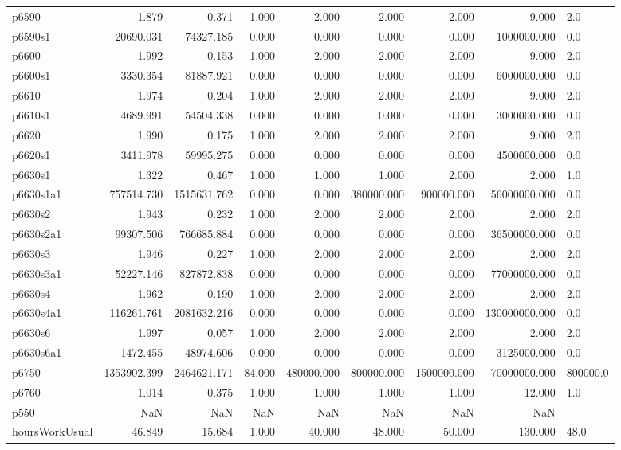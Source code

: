 \begin{longtable}{lrrrrrrrl}
p6590 & 1.879 & 0.371 & 1.000 & 2.000 & 2.000 & 2.000 & 9.000 & 2.0 \\
p6590s1 & 20690.031 & 74327.185 & 0.000 & 0.000 & 0.000 & 0.000 & 1000000.000 & 0.0 \\
p6600 & 1.992 & 0.153 & 1.000 & 2.000 & 2.000 & 2.000 & 9.000 & 2.0 \\
p6600s1 & 3330.354 & 81887.921 & 0.000 & 0.000 & 0.000 & 0.000 & 6000000.000 & 0.0 \\
p6610 & 1.974 & 0.204 & 1.000 & 2.000 & 2.000 & 2.000 & 9.000 & 2.0 \\
p6610s1 & 4689.991 & 54504.338 & 0.000 & 0.000 & 0.000 & 0.000 & 3000000.000 & 0.0 \\
p6620 & 1.990 & 0.175 & 1.000 & 2.000 & 2.000 & 2.000 & 9.000 & 2.0 \\
p6620s1 & 3411.978 & 59995.275 & 0.000 & 0.000 & 0.000 & 0.000 & 4500000.000 & 0.0 \\
p6630s1 & 1.322 & 0.467 & 1.000 & 1.000 & 1.000 & 2.000 & 2.000 & 1.0 \\
p6630s1a1 & 757514.730 & 1515631.762 & 0.000 & 0.000 & 380000.000 & 900000.000 & 56000000.000 & 0.0 \\
p6630s2 & 1.943 & 0.232 & 1.000 & 2.000 & 2.000 & 2.000 & 2.000 & 2.0 \\
p6630s2a1 & 99307.506 & 766685.884 & 0.000 & 0.000 & 0.000 & 0.000 & 36500000.000 & 0.0 \\
p6630s3 & 1.946 & 0.227 & 1.000 & 2.000 & 2.000 & 2.000 & 2.000 & 2.0 \\
p6630s3a1 & 52227.146 & 827872.838 & 0.000 & 0.000 & 0.000 & 0.000 & 77000000.000 & 0.0 \\
p6630s4 & 1.962 & 0.190 & 1.000 & 2.000 & 2.000 & 2.000 & 2.000 & 2.0 \\
p6630s4a1 & 116261.761 & 2081632.216 & 0.000 & 0.000 & 0.000 & 0.000 & 130000000.000 & 0.0 \\
p6630s6 & 1.997 & 0.057 & 1.000 & 2.000 & 2.000 & 2.000 & 2.000 & 2.0 \\
p6630s6a1 & 1472.455 & 48974.606 & 0.000 & 0.000 & 0.000 & 0.000 & 3125000.000 & 0.0 \\
p6750 & 1353902.399 & 2464621.171 & 84.000 & 480000.000 & 800000.000 & 1500000.000 & 70000000.000 & 800000.0 \\
p6760 & 1.014 & 0.375 & 1.000 & 1.000 & 1.000 & 1.000 & 12.000 & 1.0 \\
p550 & NaN & NaN & NaN & NaN & NaN & NaN & NaN &  \\
hoursWorkUsual & 46.849 & 15.684 & 1.000 & 40.000 & 48.000 & 50.000 & 130.000 & 48.0 \\

\end{longtable}
